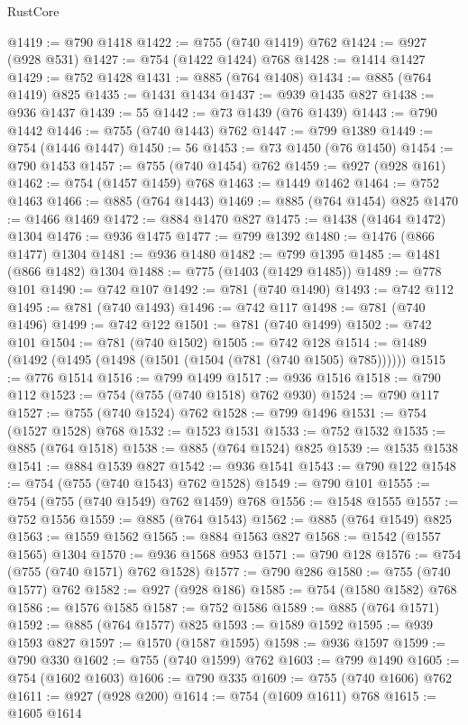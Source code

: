\begin{lexlean}{RustCore}
\begin{coremodule}
@1419 := @790 @1418
@1422 := @755 (@740 @1419) @762
@1424 := @927 (@928 @531)
@1427 := @754 (@1422 @1424) @768
@1428 := @1414 @1427
@1429 := @752 @1428
@1431 := @885 (@764 @1408)
@1434 := @885 (@764 @1419) @825
@1435 := @1431 @1434
@1437 := @939 @1435 @827
@1438 := @936 @1437
@1439 := 55
@1442 := @73 @1439 (@76 @1439)
@1443 := @790 @1442
@1446 := @755 (@740 @1443) @762
@1447 := @799 @1389
@1449 := @754 (@1446 @1447)
@1450 := 56
@1453 := @73 @1450 (@76 @1450)
@1454 := @790 @1453
@1457 := @755 (@740 @1454) @762
@1459 := @927 (@928 @161)
@1462 := @754 (@1457 @1459) @768
@1463 := @1449 @1462
@1464 := @752 @1463
@1466 := @885 (@764 @1443)
@1469 := @885 (@764 @1454) @825
@1470 := @1466 @1469
@1472 := @884 @1470 @827
@1475 := @1438 (@1464 @1472) @1304
@1476 := @936 @1475
@1477 := @799 @1392
@1480 := @1476 (@866 @1477) @1304
@1481 := @936 @1480
@1482 := @799 @1395
@1485 := @1481 (@866 @1482) @1304
@1488 := @775 (@1403 (@1429 @1485))
@1489 := @778 @101
@1490 := @742 @107
@1492 := @781 (@740 @1490)
@1493 := @742 @112
@1495 := @781 (@740 @1493)
@1496 := @742 @117
@1498 := @781 (@740 @1496)
@1499 := @742 @122
@1501 := @781 (@740 @1499)
@1502 := @742 @101
@1504 := @781 (@740 @1502)
@1505 := @742 @128
@1514 := @1489 (@1492 (@1495 (@1498 (@1501 (@1504 (@781 (@740 @1505) @785))))))
@1515 := @776 @1514
@1516 := @799 @1499
@1517 := @936 @1516
@1518 := @790 @112
@1523 := @754 (@755 (@740 @1518) @762 @930)
@1524 := @790 @117
@1527 := @755 (@740 @1524) @762
@1528 := @799 @1496
@1531 := @754 (@1527 @1528) @768
@1532 := @1523 @1531
@1533 := @752 @1532
@1535 := @885 (@764 @1518)
@1538 := @885 (@764 @1524) @825
@1539 := @1535 @1538
@1541 := @884 @1539 @827
@1542 := @936 @1541
@1543 := @790 @122
@1548 := @754 (@755 (@740 @1543) @762 @1528)
@1549 := @790 @101
@1555 := @754 (@755 (@740 @1549) @762 @1459) @768
@1556 := @1548 @1555
@1557 := @752 @1556
@1559 := @885 (@764 @1543)
@1562 := @885 (@764 @1549) @825
@1563 := @1559 @1562
@1565 := @884 @1563 @827
@1568 := @1542 (@1557 @1565) @1304
@1570 := @936 @1568 @953
@1571 := @790 @128
@1576 := @754 (@755 (@740 @1571) @762 @1528)
@1577 := @790 @286
@1580 := @755 (@740 @1577) @762
@1582 := @927 (@928 @186)
@1585 := @754 (@1580 @1582) @768
@1586 := @1576 @1585
@1587 := @752 @1586
@1589 := @885 (@764 @1571)
@1592 := @885 (@764 @1577) @825
@1593 := @1589 @1592
@1595 := @939 @1593 @827
@1597 := @1570 (@1587 @1595)
@1598 := @936 @1597
@1599 := @790 @330
@1602 := @755 (@740 @1599) @762
@1603 := @799 @1490
@1605 := @754 (@1602 @1603)
@1606 := @790 @335
@1609 := @755 (@740 @1606) @762
@1611 := @927 (@928 @200)
@1614 := @754 (@1609 @1611) @768
@1615 := @1605 @1614

\end{coremodule}
\end{lexlean}

